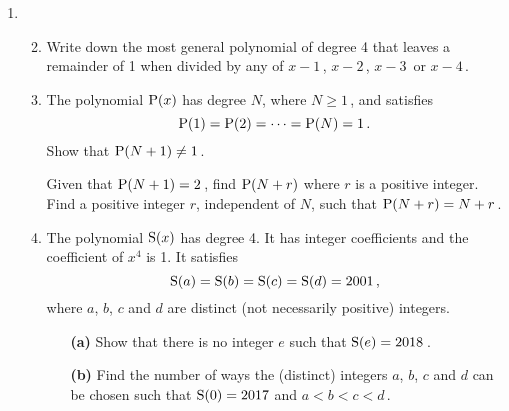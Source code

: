 \documentclass[a4, 11pt]{report}
\newlength{\qspace}
\newcounter{qnumber}
\newenvironment{question}%
 {\vspace{\qspace}
  \begin{enumerate}[\bfseries 1\quad][10]%
    \setcounter{enumi}{\value{qnumber}}%
    \item%
 }
{
  \end{enumerate}
  \filbreak
  \stepcounter{qnumber}
 }
\newenvironment{questionparts}[1][1]%
 {
  \begin{enumerate}[\bfseries (i)]%
    \setcounter{enumii}{#1}
    \addtocounter{enumii}{-1}
    \setlength{\itemsep}{5mm}
    \setlength{\parskip}{8pt}
 }
 {
  \end{enumerate}
 }
\def\P{{\rm P}}
\def\ge{\geqslant}
\begin{document}


\begin{question}
\begin{questionparts}
\item Write down the most general polynomial of degree 4 that 
leaves a remainder of 1 when divided by any of 
$x-1\,$, $x-2\,$, $x-3\,$  or $x-4\,$.


\item
The polynomial $\P(x)$ has degree $N$, where $N\ge1\,$,  
and satisfies
\[
\P(1) = \P(2) = \cdots = \P(N) =1\,.
\]
Show that $\P(N+1) \ne 1\,$. 

Given that $\P(N+1)= 2\,$, find $\P(N+r)$ where $r$ is a positive integer.
 Find a positive integer $r$, independent of $N$, 
such that  $\P(N+r) = N+r\,$.

\item
The polynomial ${\rm S}(x)$ has degree 4. It has 
integer coefficients and the coefficient of $x^4$ is 1. It
satisfies
\[
{\rm S}(a)    =
{\rm S}(b)    =
{\rm S}(c)    =
{\rm S}(d)    = 2001\,,
\]
where $a$, $b$, $c$ and $d$ are distinct (not necessarily positive)
integers.

\begin{itemize}
\item[{\bf (a)}]
Show that there is no integer $e$
such that ${\rm S}(e) = 2018\,$.

\medskip
\item[{\bf (b)}]
Find  the number of  ways the  (distinct) integers $a$, $b$, $c$ and  $d$ 
can be chosen  such that   
${\rm S}(0) = 2017$ 
 and 
 $a < b<  c< d\,$. 

\end{itemize}
\end{questionparts}
\end{question}
\end{document}
